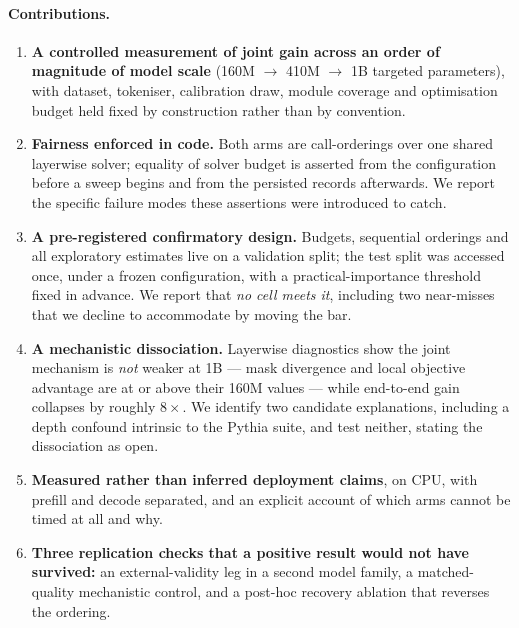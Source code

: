 \paragraph{Contributions.}
\begin{enumerate}
  \item \textbf{A controlled measurement of joint gain across an order of magnitude of
        model scale} (160M $\rightarrow$ 410M $\rightarrow$ 1B targeted parameters), with
        dataset, tokeniser, calibration draw, module coverage and optimisation budget held
        fixed by construction rather than by convention.
  \item \textbf{Fairness enforced in code.} Both arms are call-orderings over one shared
        layerwise solver; equality of solver budget is asserted from the configuration
        before a sweep begins and from the persisted records afterwards. We report the
        specific failure modes these assertions were introduced to catch.
  \item \textbf{A pre-registered confirmatory design.} Budgets, sequential orderings and all
        exploratory estimates live on a validation split; the test split was accessed once,
        under a frozen configuration, with a practical-importance threshold fixed in advance.
        We report that \emph{no cell meets it}, including two near-misses that we decline to
        accommodate by moving the bar.
  \item \textbf{A mechanistic dissociation.} Layerwise diagnostics show the joint mechanism
        is \emph{not} weaker at 1B --- mask divergence and local objective advantage are at
        or above their 160M values --- while end-to-end gain collapses by roughly $8\times$.
        We identify two candidate explanations, including a depth confound intrinsic to the
        Pythia suite, and test neither, stating the dissociation as open.
  \item \textbf{Measured rather than inferred deployment claims}, on CPU, with prefill and
        decode separated, and an explicit account of which arms cannot be timed at all and
        why.
  \item \textbf{Three replication checks that a positive result would not have survived:} an
        external-validity leg in a second model family, a matched-quality mechanistic
        control, and a post-hoc recovery ablation that reverses the ordering.
\end{enumerate}

